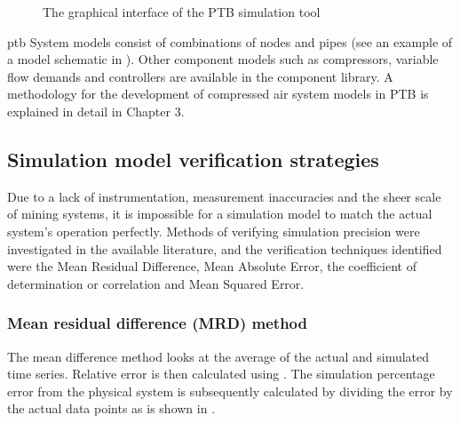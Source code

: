 \begin{figure}[h!]
 	\centering
 	\caption{The graphical interface of the PTB simulation tool}
 	\label{fig: PTB UI}
 \end{figure}
 \gls{ptb} System models consist of combinations of nodes and pipes (see an example of a model schematic in ). Other component models such as compressors, variable flow demands and controllers are available in the component library. A methodology for the development of compressed air system models in PTB is explained in detail in Chapter 3.
 	\subsection{Simulation model verification strategies}\label{VerificationLit}
 	Due to a lack of instrumentation, measurement inaccuracies and the sheer scale of mining systems, it is impossible for a simulation model to match the actual system's operation perfectly. Methods of verifying simulation precision were investigated in the available literature, and the verification techniques identified were the Mean Residual Difference, Mean Absolute Error, the coefficient of determination or correlation and Mean Squared Error.%
 		\subsubsection{Mean residual difference (MRD) method}
 			The mean difference method looks at the average of the actual and simulated time series. Relative error is then calculated using . The simulation percentage error from the physical system is subsequently calculated by dividing the error by the actual data points as is shown in .
 			
